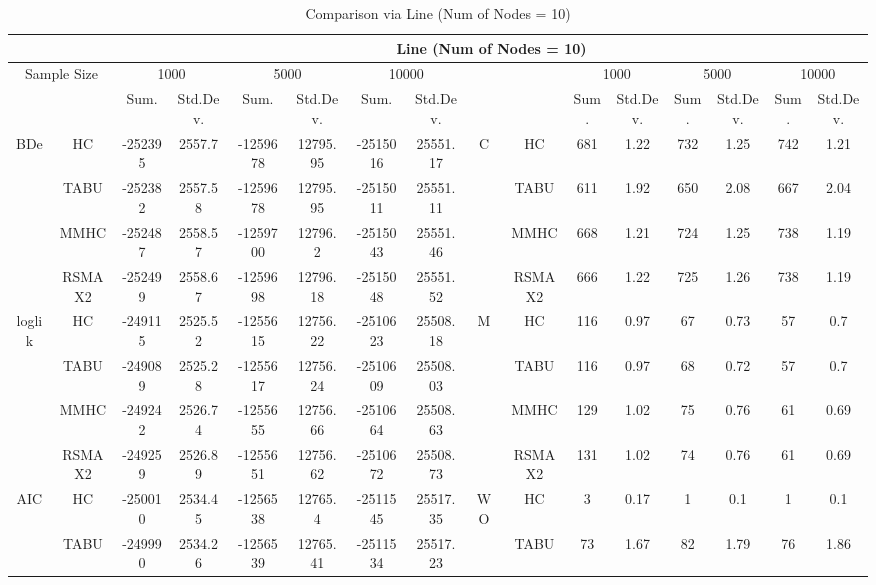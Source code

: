 \begin{table}[p]																										
\centering	\caption{Comparison via Line (Num of Nodes = 10)}	\tiny																						
{\tabcolsep=0.01in																										
\begin{tabular}{cc||cc|cc|cc||cc|cc|cc|cc}																										
\hline																										
&	&	\multicolumn{14}{c}{Line	(Num	of	Nodes	=	10)}\tabularnewline																			
\hline																										
\multicolumn{2}{c||}{Sample	Size}	&	\multicolumn{2}{c|}{1000}	&	\multicolumn{2}{c|}{5000}	&	\multicolumn{2}{c||}{10000}	&	&	&	\multicolumn{2}{c|}{1000}	&	\multicolumn{2}{c|}{5000}	&	\multicolumn{2}{c}{10000}\tabularnewline											
\hline																										
&	&	Sum.	&	Std.Dev.	&	Sum.	&	Std.Dev.	&	Sum.	&	Std.Dev.	&	&	&	Sum.	&	Std.Dev.	&	Sum.	&	Std.Dev.	&	Sum.	&	Std.Dev.\tabularnewline
\hline																										
\hline																										
\multirow{4}{*}{BDe} & HC &	-252395 & 	2557.7 & 	-1259678 & 	12795.95 & 	-2515016 & 	25551.17 & 	\multirow{4}{*}{C} & HC &	681 & 	1.22 & 	732 & 	1.25 & 	742 & 	1.21\tabularnewline													
& TABU &	-252382 & 	2557.58 & 	-1259678 & 	12795.95 & 	-2515011 & 	25551.11 & 	& TABU &	611 & 	1.92 & 	650 & 	2.08 & 	667 & 	2.04\tabularnewline													
& MMHC &	-252487 & 	2558.57 & 	-1259700 & 	12796.2 & 	-2515043 & 	25551.46 & 	& MMHC &	668 & 	1.21 & 	724 & 	1.25 & 	738 & 	1.19\tabularnewline													
& RSMAX2 &	-252499 & 	2558.67 & 	-1259698 & 	12796.18 & 	-2515048 & 	25551.52 & 	& RSMAX2 &	666 & 	1.22 & 	725 & 	1.26 & 	738 & 	1.19\tabularnewline													
\hline																										
\multirow{4}{*}{loglik} & HC &	-249115 & 	2525.52 & 	-1255615 & 	12756.22 & 	-2510623 & 	25508.18 & 	\multirow{4}{*}{M} & HC &	116 & 	0.97 & 	67 & 	0.73 & 	57 & 	0.7\tabularnewline													
& TABU &	-249089 & 	2525.28 & 	-1255617 & 	12756.24 & 	-2510609 & 	25508.03 & 	& TABU &	116 & 	0.97 & 	68 & 	0.72 & 	57 & 	0.7\tabularnewline													
& MMHC &	-249242 & 	2526.74 & 	-1255655 & 	12756.66 & 	-2510664 & 	25508.63 & 	& MMHC &	129 & 	1.02 & 	75 & 	0.76 & 	61 & 	0.69\tabularnewline													
& RSMAX2 &	-249259 & 	2526.89 & 	-1255651 & 	12756.62 & 	-2510672 & 	25508.73 & 	& RSMAX2 &	131 & 	1.02 & 	74 & 	0.76 & 	61 & 	0.69\tabularnewline													
\hline																										
\multirow{4}{*}{AIC} & HC &	-250010 & 	2534.45 & 	-1256538 & 	12765.4 & 	-2511545 & 	25517.35 & 	\multirow{4}{*}{WO} & HC &	3 & 	0.17 & 	1 & 	0.1 & 	1 & 	0.1\tabularnewline													
& TABU &	-249990 & 	2534.26 & 	-1256539 & 	12765.41 & 	-2511534 & 	25517.23 & 	& TABU &	73 & 	1.67 & 	82 & 	1.79 & 	76 & 	1.86\tabularnewline													

\end{tabular}}
\end{table}
